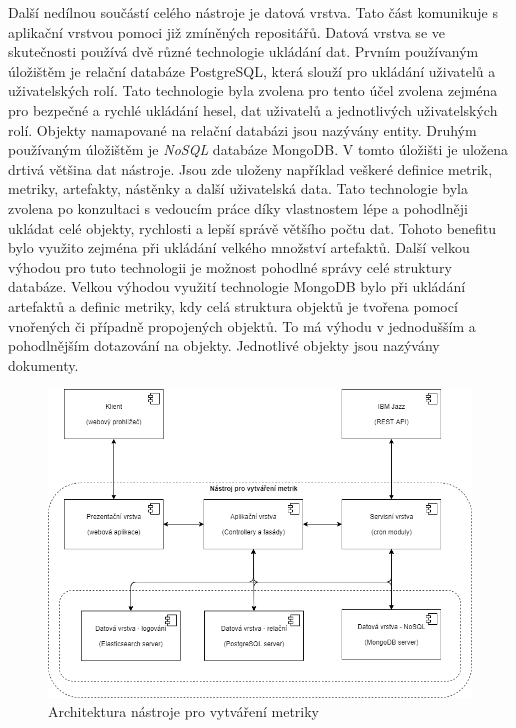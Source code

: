 \documentclass[czech,master,public,dept460,male,cpdeclaration,oneside]{diploma}
\begin{document}
Další nedílnou součástí celého nástroje je datová vrstva. Tato část komunikuje s aplikační vrstvou pomoci již zmíněných repositářů. Datová vrstva se ve skutečnosti používá dvě různé technologie ukládání dat. Prvním používaným úložištěm je relační databáze PostgreSQL, která slouží pro ukládání uživatelů a uživatelských rolí. Tato technologie byla zvolena pro tento účel zvolena zejména pro bezpečné a rychlé ukládání hesel, dat uživatelů a jednotlivých uživatelských rolí. Objekty namapované na relační databázi jsou nazývány entity. Druhým používaným úložištěm je \textit{NoSQL} databáze MongoDB. V tomto úložišti je uložena drtivá většina dat nástroje. Jsou zde uloženy například veškeré definice metrik, metriky, artefakty, nástěnky a další uživatelská data. Tato technologie byla zvolena po konzultaci s vedoucím práce díky vlastnostem lépe a pohodlněji ukládat celé objekty, rychlosti a lepší správě většího počtu dat. Tohoto benefitu bylo využito zejména při ukládání velkého množství artefaktů. Další velkou výhodou pro tuto technologii je možnost pohodlné správy celé struktury databáze. Velkou výhodou využití technologie MongoDB bylo při ukládání artefaktů a definic metriky, kdy celá struktura objektů je tvořena pomocí vnořených či případně propojených objektů. To má výhodu v jednodušším a pohodlnějším dotazování na objekty. Jednotlivé objekty jsou nazývány dokumenty. 


 
\begin{figure}[!ht]
    \centering
    \includegraphics[width=1\textwidth]{Diplomka/Figures/architektura.png}
    \caption{Architektura nástroje pro vytváření metriky}
    \label{fig:architektura_nastroje}
\end{figure}
\end{document}
